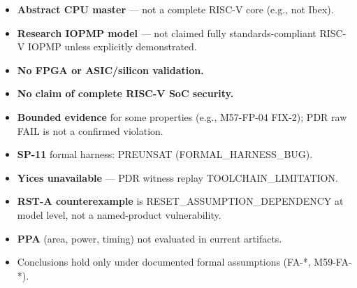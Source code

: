 \begin{itemize}
  \item \textbf{Abstract CPU master} --- not a complete RISC-V core (e.g., not Ibex).
  \item \textbf{Research IOPMP model} --- not claimed fully standards-compliant RISC-V IOPMP unless explicitly demonstrated.
  \item \textbf{No FPGA or ASIC/silicon validation.}
  \item \textbf{No claim of complete RISC-V SoC security.}
  \item \textbf{Bounded evidence} for some properties (e.g., M57-FP-04 FIX-2); PDR raw FAIL is not a confirmed violation.
  \item \textbf{SP-11} formal harness: PREUNSAT (FORMAL\_HARNESS\_BUG).
  \item \textbf{Yices unavailable} --- PDR witness replay TOOLCHAIN\_LIMITATION.
  \item \textbf{RST-A counterexample} is RESET\_ASSUMPTION\_DEPENDENCY at model level, not a named-product vulnerability.
  \item \textbf{PPA} (area, power, timing) not evaluated in current artifacts.
  \item Conclusions hold only under documented formal assumptions (FA-*, M59-FA-*).
\end{itemize}
